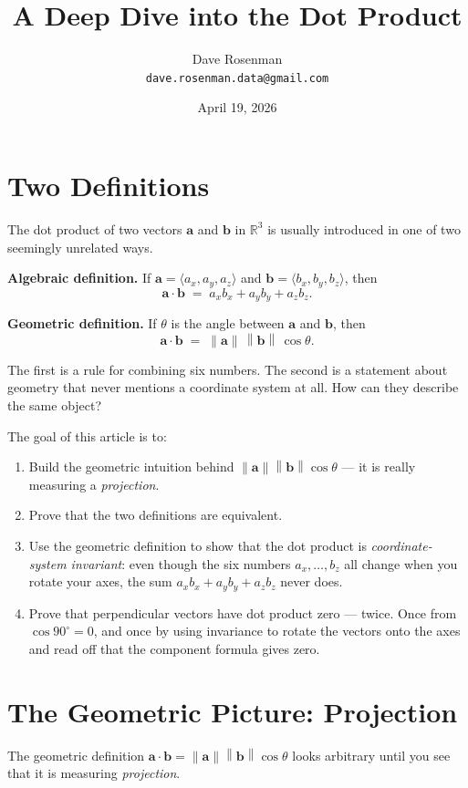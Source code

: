 \documentclass[11pt]{article}
\title{A Deep Dive into the Dot Product}
\author{Dave Rosenman \\ \texttt{dave.rosenman.data@gmail.com}}
\date{April 19, 2026}
\newcommand{\vect}[1]{\mathbf{#1}}
\newcommand{\norm}[1]{\left\lVert #1 \right\rVert}
\begin{document}
\maketitle

\section{Two Definitions}

The dot product of two vectors $\vect{a}$ and $\vect{b}$ in $\mathbb{R}^3$ is usually introduced in one of two seemingly unrelated ways.

\textbf{Algebraic definition.} If $\vect{a} = \langle a_x, a_y, a_z \rangle$ and $\vect{b} = \langle b_x, b_y, b_z \rangle$, then
\[
  \vect{a} \cdot \vect{b} \;=\; a_x b_x + a_y b_y + a_z b_z.
\]

\textbf{Geometric definition.} If $\theta$ is the angle between $\vect{a}$ and $\vect{b}$, then
\[
  \vect{a} \cdot \vect{b} \;=\; \norm{\vect{a}}\,\norm{\vect{b}}\,\cos\theta.
\]

The first is a rule for combining six numbers. The second is a statement about geometry that never mentions a coordinate system at all. How can they describe the same object?

The goal of this article is to:
\begin{enumerate}
  \item Build the geometric intuition behind $\norm{\vect{a}}\norm{\vect{b}}\cos\theta$ — it is really measuring a \emph{projection}.
  \item Prove that the two definitions are equivalent.
  \item Use the geometric definition to show that the dot product is \emph{coordinate-system invariant}: even though the six numbers $a_x,\dots,b_z$ all change when you rotate your axes, the sum $a_x b_x + a_y b_y + a_z b_z$ never does.
  \item Prove that perpendicular vectors have dot product zero — twice. Once from $\cos 90^\circ = 0$, and once by using invariance to rotate the vectors onto the axes and read off that the component formula gives zero.
\end{enumerate}

\section{The Geometric Picture: Projection}

The geometric definition $\vect{a}\cdot\vect{b} = \norm{\vect{a}}\norm{\vect{b}}\cos\theta$ looks arbitrary until you see that it is measuring \emph{projection}.
\end{document}
